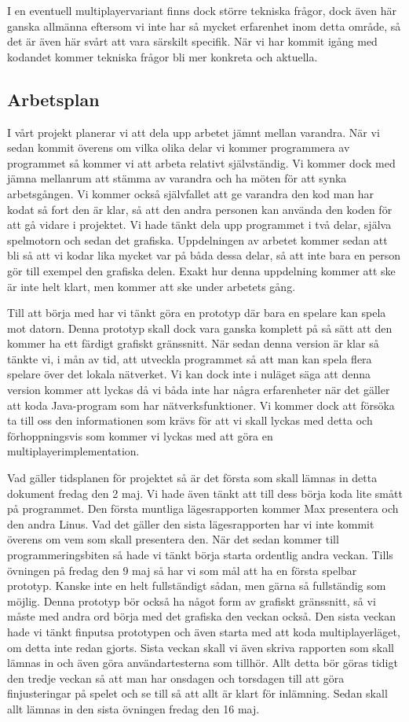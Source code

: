 \documentclass[10pt,twoside,a4paper]{article}
\begin{document}
I en eventuell multiplayervariant finns dock större tekniska frågor, dock
även här ganska allmänna eftersom vi inte har så mycket erfarenhet inom
detta område, så det är även här svårt att vara särskilt specifik. När vi
har kommit igång med kodandet kommer tekniska frågor bli mer konkreta och
aktuella.

\subsection*{Arbetsplan}

I vårt projekt planerar vi att dela upp arbetet jämnt mellan varandra. När
vi sedan kommit överens om vilka olika delar vi kommer programmera av
programmet så kommer vi att arbeta relativt självständig. Vi kommer dock
med jämna mellanrum att stämma av varandra och ha möten för att synka
arbetsgången. Vi kommer också självfallet att ge varandra den kod man har
kodat så fort den är klar, så att den andra personen kan använda den koden
för att gå vidare i projektet. Vi hade tänkt dela upp programmet i två
delar, själva spelmotorn och sedan det grafiska. Uppdelningen av arbetet
kommer sedan att bli så att vi kodar lika mycket var på båda dessa delar,
så att inte bara en person gör till exempel den grafiska delen. Exakt hur
denna uppdelning kommer att ske är inte helt klart, men kommer att ske
under arbetets gång.

Till att börja med har vi tänkt göra en prototyp där bara en spelare kan
spela mot datorn. Denna prototyp skall dock vara ganska komplett på så sätt
att den kommer ha ett färdigt grafiskt gränssnitt. När sedan denna version
är klar så tänkte vi, i mån av tid, att utveckla programmet så att man kan
spela flera spelare över det lokala nätverket. Vi kan dock inte i nuläget
säga att denna version kommer att lyckas då vi båda inte har några
erfarenheter när det gäller att koda Java-program som har
nätverksfunktioner. Vi kommer dock att försöka ta till oss den
informationen som krävs för att vi skall lyckas med detta och
förhoppningsvis som kommer vi lyckas med att göra en
multiplayerimplementation.

Vad gäller tidsplanen för projektet så är det första som skall lämnas in
detta dokument fredag den 2 maj. Vi hade även tänkt att till dess börja
koda lite smått på programmet. Den första muntliga lägesrapporten kommer
Max presentera och den andra Linus. Vad det gäller den sista lägesrapporten
har vi inte kommit överens om vem som skall presentera den. När det sedan
kommer till programmeringsbiten så hade vi tänkt börja starta ordentlig
andra veckan. Tills övningen på fredag den 9 maj så har vi som mål att ha
en första spelbar prototyp. Kanske inte en helt fullständigt sådan, men
gärna så fullständig som möjlig. Denna prototyp bör också ha något form av
grafiskt gränssnitt, så vi måste med andra ord börja med det grafiska den
veckan också. Den sista veckan hade vi tänkt finputsa prototypen och även
starta med att koda multiplayerläget, om detta inte redan gjorts. Sista
veckan skall vi även skriva rapporten som skall lämnas in och även göra
användartesterna som tillhör. Allt detta bör göras tidigt den tredje veckan
så att man har onsdagen och torsdagen till att göra finjusteringar på
spelet och se till så att allt är klart för inlämning. Sedan skall allt
lämnas in den sista övningen fredag den 16 maj.
\end{document}
